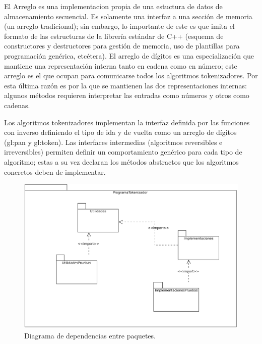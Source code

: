 El Arreglo es una implementacion propia de una estuctura de datos de
almacenamiento secuencial. Es solamente una interfaz a una sección
de memoria (un arreglo tradicional); sin embargo, lo importante de este es
que imita el formato de las estructuras de la librería estándar de C++
(esquema de constructores y destructores para gestión de memoria, uso
de plantillas para programación genérica, etcétera). El arreglo de dígitos es
una especialización que mantiene una representación interna tanto en cadena como
en número; este arreglo es el que ocupan para comunicarse todos los
algoritmos tokenizadores. Por esta última razón es por la que se
mantienen las dos representaciones internas: algunos métodos requieren
interpretar las entradas como números y otros como cadenas.

Los algoritmos tokenizadores implementan la interfaz definida por las
funciones con inverso definiendo el tipo de ida y de vuelta como un
arreglo de dígitos (\gls{gl:pan} y \gls{gl:token}). Las interfaces intermedias
(algoritmos reversibles e irreversibles) permiten definir un comportamiento
genérico para cada tipo de algoritmo; estas a su vez declaran los métodos
abstractos que los algoritmos concretos deben de implementar.

\begin{figure}
  \begin{center}
    \includegraphics[width=0.6\linewidth]{diagramas/paquetes.png}
    \caption{Diagrama de dependencias entre paquetes.}
    \label{paquetes_general}
  \end{center}
\end{figure}

